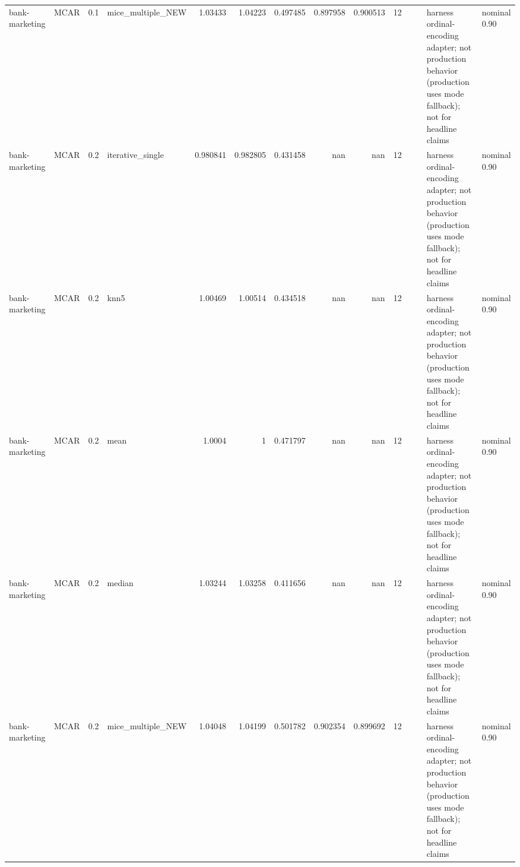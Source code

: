 \begin{table}[ht]
\begin{tabular}{llrlrrrrrrllll}
 bank-marketing       & MCAR        &         0.1 & mice\_multiple\_NEW &       1.03433  &             1.04223  &                 0.497485 &                       0.897958 &                         0.900513 &        12 &                    &                                         & harness ordinal-encoding adapter; not production behavior (production uses mode fallback); not for headline claims & nominal 0.90              \\
 bank-marketing       & MCAR        &         0.2 & iterative\_single  &       0.980841 &             0.982805 &                 0.431458 &                     nan        &                       nan        &        12 &                    &                                         & harness ordinal-encoding adapter; not production behavior (production uses mode fallback); not for headline claims & nominal 0.90              \\
 bank-marketing       & MCAR        &         0.2 & knn5              &       1.00469  &             1.00514  &                 0.434518 &                     nan        &                       nan        &        12 &                    &                                         & harness ordinal-encoding adapter; not production behavior (production uses mode fallback); not for headline claims & nominal 0.90              \\
 bank-marketing       & MCAR        &         0.2 & mean              &       1.0004   &             1        &                 0.471797 &                     nan        &                       nan        &        12 &                    &                                         & harness ordinal-encoding adapter; not production behavior (production uses mode fallback); not for headline claims & nominal 0.90              \\
 bank-marketing       & MCAR        &         0.2 & median            &       1.03244  &             1.03258  &                 0.411656 &                     nan        &                       nan        &        12 &                    &                                         & harness ordinal-encoding adapter; not production behavior (production uses mode fallback); not for headline claims & nominal 0.90              \\
 bank-marketing       & MCAR        &         0.2 & mice\_multiple\_NEW &       1.04048  &             1.04199  &                 0.501782 &                       0.902354 &                         0.899692 &        12 &                    &                                         & harness ordinal-encoding adapter; not production behavior (production uses mode fallback); not for headline claims & nominal 0.90              \\

\end{tabular}
\end{table}
